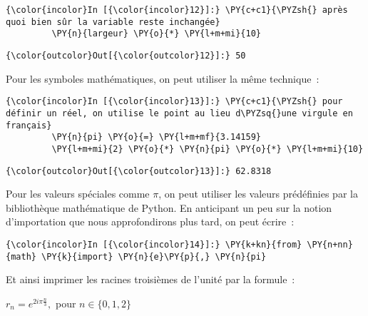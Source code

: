     \begin{Verbatim}[commandchars=\\\{\},frame=single,framerule=0.3mm,rulecolor=\color{cellframecolor}]
{\color{incolor}In [{\color{incolor}12}]:} \PY{c+c1}{\PYZsh{} après quoi bien sûr la variable reste inchangée}
         \PY{n}{largeur} \PY{o}{*} \PY{l+m+mi}{10}
\end{Verbatim}


\begin{Verbatim}[commandchars=\\\{\},frame=single,framerule=0.3mm,rulecolor=\color{cellframecolor}]
{\color{outcolor}Out[{\color{outcolor}12}]:} 50
\end{Verbatim}
            
    Pour les symboles mathématiques, on peut utiliser la même technique~:

    \begin{Verbatim}[commandchars=\\\{\},frame=single,framerule=0.3mm,rulecolor=\color{cellframecolor}]
{\color{incolor}In [{\color{incolor}13}]:} \PY{c+c1}{\PYZsh{} pour définir un réel, on utilise le point au lieu d\PYZsq{}une virgule en français}
         \PY{n}{pi} \PY{o}{=} \PY{l+m+mf}{3.14159}
         \PY{l+m+mi}{2} \PY{o}{*} \PY{n}{pi} \PY{o}{*} \PY{l+m+mi}{10}
\end{Verbatim}


\begin{Verbatim}[commandchars=\\\{\},frame=single,framerule=0.3mm,rulecolor=\color{cellframecolor}]
{\color{outcolor}Out[{\color{outcolor}13}]:} 62.8318
\end{Verbatim}
            
    Pour les valeurs spéciales comme \(\pi\), on peut utiliser les valeurs
prédéfinies par la bibliothèque mathématique de Python. En anticipant un
peu sur la notion d'importation que nous approfondirons plus tard, on
peut écrire~:

    \begin{Verbatim}[commandchars=\\\{\},frame=single,framerule=0.3mm,rulecolor=\color{cellframecolor}]
{\color{incolor}In [{\color{incolor}14}]:} \PY{k+kn}{from} \PY{n+nn}{math} \PY{k}{import} \PY{n}{e}\PY{p}{,} \PY{n}{pi}
\end{Verbatim}


    Et ainsi imprimer les racines troisièmes de l'unité par la formule~:

\(r_n = e^{2i\pi \frac{n}{3}},\) pour \(n\in \{0,1,2\}\)

